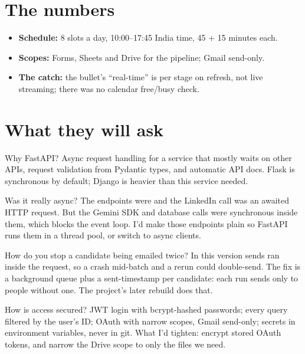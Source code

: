 \section{The numbers}

\begin{measured}
\begin{itemize}
  \item \textbf{Schedule:} 8 slots a day, 10:00--17:45 India time, 45 + 15 minutes each.
  \item \textbf{Scopes:} Forms, Sheets and Drive for the pipeline; Gmail send-only.
  \item \textbf{The catch:} the bullet's ``real-time'' is per stage on refresh, not live streaming; there was no calendar free/busy check.
\end{itemize}
\end{measured}

\section{What they will ask}

\begin{iq}[\core]{Why FastAPI?}
Async request handling for a service that mostly waits on other APIs, request validation from Pydantic types, and automatic API docs. Flask is synchronous by default; Django is heavier than this service needed.
\end{iq}

\begin{iq}[\core]{Was it really async?}
The endpoints were  and the LinkedIn call was an awaited HTTP request. But the Gemini SDK and database calls were synchronous inside them, which blocks the event loop. I'd make those endpoints plain  so FastAPI runs them in a thread pool, or switch to async clients.
\end{iq}

\begin{iq}[\core]{How do you stop a candidate being emailed twice?}
In this version sends ran inside the request, so a crash mid-batch and a rerun could double-send. The fix is a background queue plus a sent-timestamp per candidate: each run sends only to people without one. The project's later rebuild does that.
\end{iq}

\begin{iq}{How is access secured?}
JWT login with bcrypt-hashed passwords; every query filtered by the user's ID; OAuth with narrow scopes, Gmail send-only; secrets in environment variables, never in git. What I'd tighten: encrypt stored OAuth tokens, and narrow the Drive scope to only the files we need.
\end{iq}

